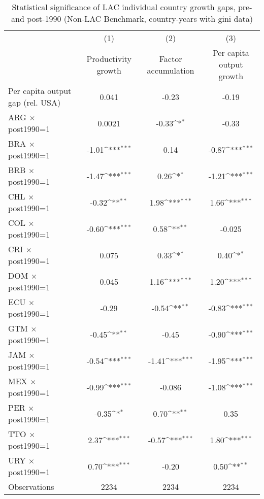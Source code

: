 \begin{table}[htbp]\centering
\def\sym#1{\ifmmode^{#1}\else\(^{#1}\)\fi}
\caption{Statistical significance of LAC individual country growth gaps, pre- and post-1990 (Non-LAC Benchmark, country-years with gini data)}
\begin{tabular}{l*{3}{c}}
\toprule
                &\multicolumn{1}{c}{(1)}&\multicolumn{1}{c}{(2)}&\multicolumn{1}{c}{(3)}\\
                &\multicolumn{1}{c}{Productivity growth}&\multicolumn{1}{c}{Factor accumulation}&\multicolumn{1}{c}{Per capita output growth}\\
\midrule
Per capita output gap (rel. USA)&    0.041         &    -0.23         &    -0.19         \\
ARG $\times$ post1990=1&   0.0021         &    -0.33\sym{*}  &    -0.33         \\
BRA $\times$ post1990=1&    -1.01\sym{***}&     0.14         &    -0.87\sym{***}\\
BRB $\times$ post1990=1&    -1.47\sym{***}&     0.26\sym{*}  &    -1.21\sym{***}\\
CHL $\times$ post1990=1&    -0.32\sym{**} &     1.98\sym{***}&     1.66\sym{***}\\
COL $\times$ post1990=1&    -0.60\sym{***}&     0.58\sym{**} &   -0.025         \\
CRI $\times$ post1990=1&    0.075         &     0.33\sym{*}  &     0.40\sym{*}  \\
DOM $\times$ post1990=1&    0.045         &     1.16\sym{***}&     1.20\sym{***}\\
ECU $\times$ post1990=1&    -0.29         &    -0.54\sym{**} &    -0.83\sym{***}\\
GTM $\times$ post1990=1&    -0.45\sym{**} &    -0.45         &    -0.90\sym{***}\\
JAM $\times$ post1990=1&    -0.54\sym{***}&    -1.41\sym{***}&    -1.95\sym{***}\\
MEX $\times$ post1990=1&    -0.99\sym{***}&   -0.086         &    -1.08\sym{***}\\
PER $\times$ post1990=1&    -0.35\sym{*}  &     0.70\sym{**} &     0.35         \\
TTO $\times$ post1990=1&     2.37\sym{***}&    -0.57\sym{***}&     1.80\sym{***}\\
URY $\times$ post1990=1&     0.70\sym{***}&    -0.20         &     0.50\sym{**} \\
\midrule
Observations    &     2234         &     2234         &     2234         \\

\end{tabular}
\end{table}
